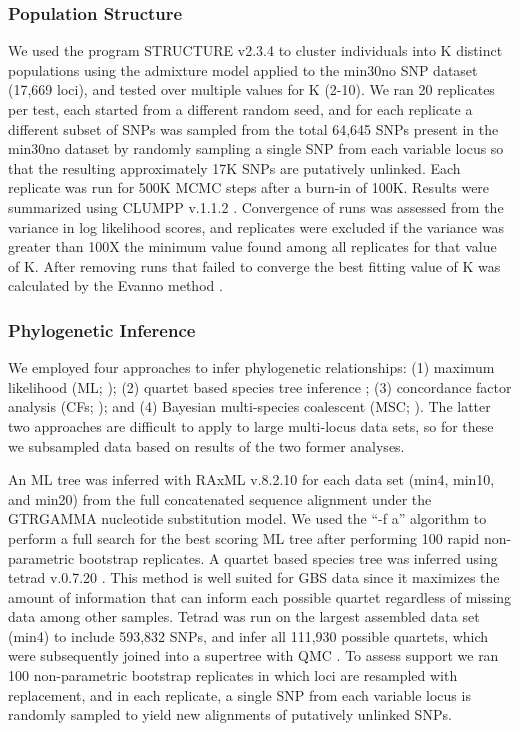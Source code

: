 \documentclass[10pt,letterpaper]{article}
\begin{document}
\subsubsection*{Population Structure}
We used the program STRUCTURE v2.3.4 \cite{pritchard_inference_2000}
to cluster individuals into K distinct populations using the admixture model applied to the min30no SNP dataset (17,669 loci), and tested over multiple values for K (2-10). We ran 20 replicates per test, each started from a different random seed, and for each replicate a different subset of SNPs was sampled from the total 64,645 SNPs present in the min30no dataset by randomly sampling a single SNP from each variable locus so that the resulting approximately 17K SNPs are putatively unlinked. Each replicate was run for 500K MCMC steps after a burn-in of 100K. Results were summarized using CLUMPP v.1.1.2 \cite{jakobsson_clumpp:_2007}. Convergence of runs was assessed from the variance in log likelihood scores, and replicates were excluded if the variance was greater than 100X the minimum value found among all replicates for that value of K. After removing runs that failed to converge the best fitting value of K was calculated by the Evanno method \cite{evanno_detecting_2005}.

\subsubsection*{Phylogenetic Inference}
We employed four approaches to infer phylogenetic relationships: (1) maximum likelihood (ML; \cite{felsenstein_evolutionary_1981}); (2) quartet based species tree inference \cite{chifman_quartet_2014}; (3) concordance factor analysis (CFs; \cite{baum_concordance_2007}); and (4) Bayesian multi-species coalescent (MSC; \cite{yang_bpp_2015}). The latter two approaches are difficult to apply to large multi-locus data sets, so for these we subsampled data based on results of the two former analyses. 

An ML tree was inferred with RAxML v.8.2.10 \cite{stamatakis_raxml_2014} for each data set (min4, min10, and min20) from the full concatenated sequence alignment under the GTRGAMMA nucleotide substitution model. We used the “-f a” algorithm to perform a full search for the best scoring ML tree after performing 100 rapid non-parametric bootstrap replicates. A quartet based species tree was inferred using tetrad v.0.7.20 \cite{eaton_misconceptions_2017}. This method is well suited for GBS data since it maximizes the amount of information that can inform each possible quartet regardless of missing data among other samples. Tetrad was run on the largest assembled data set (min4) to include 593,832 SNPs, and infer all 111,930 possible quartets, which were subsequently joined into a supertree with QMC \cite{snir_quartets_2010}. To assess support we ran 100 non-parametric bootstrap replicates in which loci are resampled with replacement, and in each replicate, a single SNP from each variable locus is randomly sampled to yield new alignments of putatively unlinked SNPs. 
\end{document}
